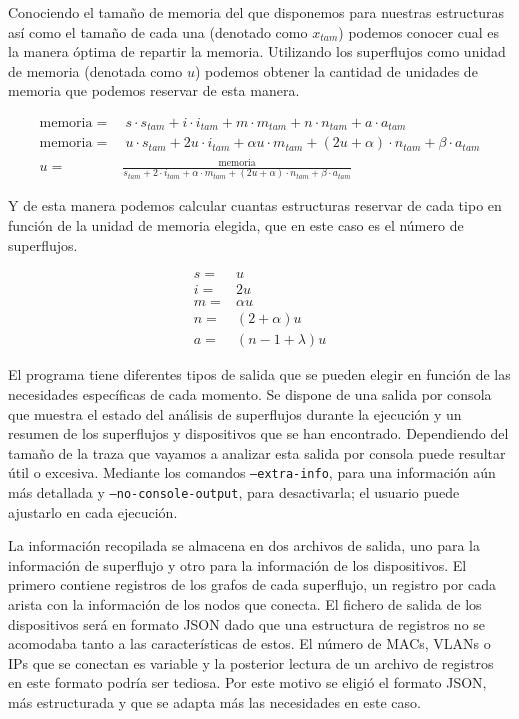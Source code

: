 \documentclass[tfg,epsbased,lof,lot,loa,final,nocopyright,overleaf]{tfgtfmthesisuam}
\begin{document}
Conociendo el tamaño de memoria del que disponemos para nuestras estructuras así como el tamaño de cada una (denotado como $x_{tam}$) podemos conocer cual es la manera óptima de repartir la memoria. Utilizando los superflujos como unidad de memoria (denotada como $u$) podemos obtener la cantidad de unidades de memoria que podemos reservar de esta manera.

\begin{align*}
	\mathrm{memoria}  = &\  s \cdot s_{tam} + i \cdot i_{tam} + m \cdot m_{tam} + n \cdot n_{tam} + a \cdot a_{tam}\\
	\mathrm{memoria}  = &\  u \cdot s_{tam} + 2u \cdot i_{tam} + \alpha u \cdot m_{tam} + (2u+\alpha) \cdot n_{tam} + \beta \cdot a_{tam} \\
	u  = & \frac{\mathrm{memoria}}{s_{tam} + 2 \cdot i_{tam} + \alpha \cdot m_{tam} + (2u+\alpha) \cdot n_{tam} + \beta \cdot a_{tam}}
\end{align*}

Y de esta manera podemos calcular cuantas estructuras reservar de cada tipo en función de la unidad de memoria elegida, que en este caso es el número de superflujos.

\begin{align*}
	s =& u\\ 
	i =& 2u\\ 
	m =& \alpha u\\
	n =& (2+\alpha)u\\
	a =& (n - 1 + \lambda) u
\end{align*}

El programa tiene diferentes tipos de salida que se pueden elegir en función de las necesidades específicas de cada momento. Se dispone de una salida por consola que muestra el estado del análisis de superflujos durante la ejecución y un resumen de los superflujos y dispositivos que se han encontrado. Dependiendo del tamaño de la traza que vayamos a analizar esta salida por consola puede resultar útil o excesiva. Mediante los comandos \texttt{--extra-info}, para una información aún más detallada y \texttt{--no-console-output}, para desactivarla; el usuario puede ajustarlo en cada ejecución.

La información recopilada se almacena en dos archivos de salida, uno para la información de superflujo y otro para la información de los dispositivos. El primero contiene registros de los grafos de cada superflujo, un registro por cada arista con la información de los nodos que conecta. El fichero de salida de los dispositivos será en formato JSON dado que una estructura de registros no se acomodaba tanto a las características de estos. El número de MACs, VLANs o IPs que se conectan es variable y la posterior lectura de un archivo de registros en este formato podría ser tediosa. Por este motivo se eligió el formato JSON, más estructurada y que se adapta más las necesidades en este caso.
\end{document}
